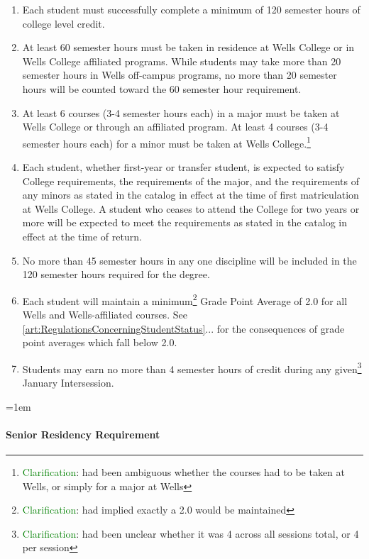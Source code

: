 \documentclass{manual}
\newcommand{\modified}[1]{}
\let\oldparagraph\paragraph
\renewcommand\paragraph{\leftskip=1em\oldparagraph}
\newcommand{\editRemark}[3]{\textcolor{green}{#2}\footnote{\textcolor{green}{#1}: #3}}
\newcommand{\editRemove}[1]{}
\newcommand{\they}{(pronoun)~ }
\newcommand{\their}{(pronoun)~ }
\newcommand{\itemLevelA}{\alph*.}
\newcommand{\itemRefA}{\alph*}
\begin{document}
\begin{enumerate}[label=\itemLevelA,ref=\itemRefA]
\item Each student must successfully complete a minimum of 120 semester\modified{5/13/93} hours of college level credit.
\item At least 60 semester hours must be taken in residence at Wells College\modified{5/13/93} or in Wells College affiliated programs. While students may take more than 20 semester hours in Wells off-campus programs, no more than 20 semester hours will be counted toward the 60 semester hour requirement.
\item At least 6 courses (3-4 semester hours each) in a major must be taken at Wells College or through an affiliated program. At least 4 courses (3-4 semester hours each) for a minor must be taken at Wells College.\editRemark{Clarification}{}{had been ambiguous whether the courses had to be taken at Wells, or simply for a major at Wells}
\item Each student, whether first-year or transfer student, is expected to satisfy College requirements, the requirements of the major, and the requirements \modified{4/8/97} of any minors as stated in the catalog in effect at the time of first matriculation at Wells College. A student who ceases to attend the College for two years or more\editRemove{, \they} will be expected to meet the requirements as stated in the catalog in effect at the time of return.
\item No more than 45 semester hours in any one discipline will be included \modified{5/13/93}  in the 120 semester hours required for the degree.
\item Each student will maintain a minimum\editRemark{Clarification}{}{had implied exactly a 2.0 would be maintained} Grade Point Average of 2.0 for all \editRemove{\their} Wells and Wells-affiliated courses. See \cref{art:RegulationsConcerningStudentStatus}... for the consequences of grade point averages which fall below 2.0.
\item Students may earn no more than 4 semester hours of credit during any given\editRemark{Clarification}{}{had been unclear whether it was 4 across all sessions total, or 4 per session} January  Intersession.\modified{2/8/05}
\end{enumerate}

\paragraph{Senior Residency Requirement}
\end{document}
